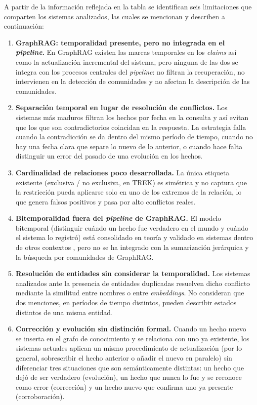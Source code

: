 A partir de la información reflejada en la tabla se identifican seis limitaciones que comparten los sistemas analizados, las cuales se mencionan y describen a continuación:
\begin{enumerate}
    \item \textbf{GraphRAG: temporalidad presente, pero no integrada en el \emph{pipeline}.} En GraphRAG existen las marcas temporales en los \emph{claims} así como la actualización incremental del sistema, pero ninguna de las dos se integra con los procesos centrales del \emph{pipeline}: no filtran la recuperación, no intervienen en la detección de comunidades y no afectan la descripción de las comunidades.

    \item \textbf{Separación temporal en lugar de resolución de conflictos.} Los sistemas más maduros filtran los hechos por fecha en la consulta y así evitan que los que son contradictorios coincidan en la respuesta. La estrategia falla cuando la contradicción se da dentro del mismo período de tiempo, cuando no hay una fecha clara que separe lo nuevo de lo anterior, o cuando hace falta distinguir un error del pasado de una evolución en los hechos.

    \item \textbf{Cardinalidad de relaciones poco desarrollada.} La única etiqueta existente (exclusiva / no exclusiva, en TREK) es simétrica y no captura que la restricción pueda aplicarse solo en uno de los extremos de la relación, lo que genera falsos positivos y pasa por alto conflictos reales.

    \item \textbf{Bitemporalidad fuera del \emph{pipeline} de GraphRAG.} El modelo bitemporal (distinguir cuándo un hecho fue verdadero en el mundo y cuándo el sistema lo registró) está consolidado en teoría y validado en sistemas dentro de otros contextos \cite{zep2025}, pero no se ha integrado con la sumarización jerárquica y la búsqueda por comunidades de GraphRAG.

    \item \textbf{Resolución de entidades sin considerar la temporalidad.} Los sistemas analizados ante la presencia de entidades duplicadas resuelven dicho conflicto mediante la similitud entre nombres o entre \emph{embeddings}. No consideran que dos menciones, en períodos de tiempo distintos, pueden describir estados distintos de una misma entidad.

    \item \textbf{Corrección y evolución sin distinción formal.} Cuando un hecho nuevo se inserta en el grafo de conocimiento y se relaciona con uno ya existente, los sistemas actuales aplican un mismo procedimiento de actualización (por lo general, sobrescribir el hecho anterior o añadir el nuevo en paralelo) sin diferenciar tres situaciones que son semánticamente distintas: un hecho que dejó de ser verdadero (evolución), un hecho que nunca lo fue y se reconoce como error (corrección) y un hecho nuevo que confirma uno ya presente (corroboración).
\end{enumerate}


